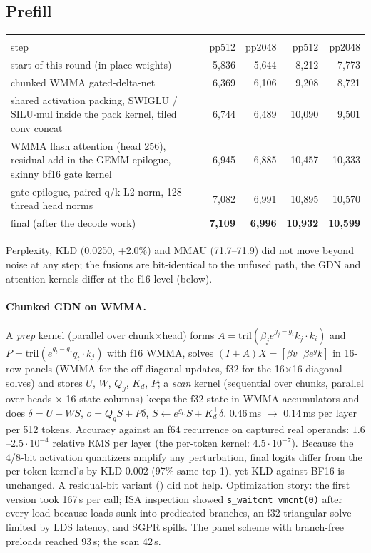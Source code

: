 \documentclass[10pt,a4paper]{article}
\newcommand{\tx}[1]{\texttt{\detokenize{#1}}}
\begin{document}
\subsection{Prefill}
\begin{center}\small
\begin{tabular}{@{}p{7.4cm}rrrr@{}}
\toprule
 & \multicolumn{2}{c}{\tx{quality}} & \multicolumn{2}{c}{\tx{fast}}\\
step & pp512 & pp2048 & pp512 & pp2048\\
\midrule
start of this round (in-place weights) & 5{,}836 & 5{,}644 & 8{,}212 & 7{,}773\\
chunked WMMA gated-delta-net & 6{,}369 & 6{,}106 & 9{,}208 & 8{,}721\\
shared activation packing, SWIGLU / SILU$\cdot$mul inside the pack kernel, tiled conv concat & 6{,}744 & 6{,}489 & 10{,}090 & 9{,}501\\
WMMA flash attention (head 256), residual add in the GEMM epilogue, skinny bf16 gate kernel & 6{,}945 & 6{,}885 & 10{,}457 & 10{,}333\\
gate epilogue, paired q/k L2 norm, 128-thread head norms & 7{,}082 & 6{,}991 & 10{,}895 & 10{,}570\\
final (after the decode work) & \textbf{7{,}109} & \textbf{6{,}996} & \textbf{10{,}932} & \textbf{10{,}599}\\
\bottomrule
\end{tabular}
\end{center}
Perplexity, KLD (0.0250, +2.0\%) and MMAU (71.7--71.9) did not move beyond noise at any step; the fusions are bit-identical to the unfused
path, the GDN and attention kernels differ at the f16 level (below).

\paragraph{Chunked GDN on WMMA.} A \emph{prep} kernel (parallel over chunk$\times$head) forms $A=\mathrm{tril}(\beta_j e^{g_j-g_i}k_j\!\cdot\!k_i)$
and $P=\mathrm{tril}(e^{g_t-g_j}q_t\!\cdot\!k_j)$ with f16 WMMA, solves $(I+A)X=[\beta v\,|\,\beta e^{g}k]$ in 16-row panels (WMMA for the off-diagonal
updates, f32 for the 16$\times$16 diagonal solves) and stores $U$, $W$, $Q_g$, $K_d$, $P$; a \emph{scan} kernel (sequential over chunks,
parallel over heads $\times$ 16 state columns) keeps the f32 state in WMMA accumulators and does $\delta=U-WS$, $o=Q_gS+P\delta$,
$S\leftarrow e^{g_C}S+K_d^{\!\top}\delta$. 0.46\,ms $\to$ 0.14\,ms per layer per 512 tokens. Accuracy against an f64 recurrence on captured real
operands: $1.6$--$2.5\cdot10^{-4}$ relative RMS per layer (the per-token kernel: $4.5\cdot10^{-7}$). Because the 4/8-bit activation
quantizers amplify any perturbation, final logits differ from the per-token kernel's by KLD 0.002 (97\% same top-1), yet KLD against BF16 is
unchanged. A residual-bit variant (\tx{GGML_GDN_CHUNK=2}) did not help. Optimization story: the first version took 167\,\textmu s per call; ISA inspection
showed \texttt{s\_waitcnt vmcnt(0)} after every load because loads sunk into predicated branches, an f32 triangular solve limited by LDS latency, and
SGPR spills. The panel scheme with branch-free preloads reached 93\,\textmu s; the scan 42\,\textmu s.
\end{document}
